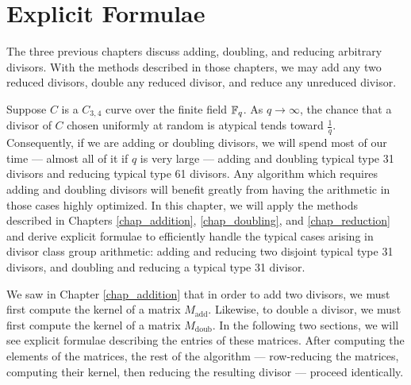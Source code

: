 
\section{Explicit Formulae}
\label{chap_typical_case}

The three previous chapters discuss adding, doubling, and reducing arbitrary divisors.
With the methods described in those chapters, we may add any two reduced divisors,
double any reduced divisor, and reduce any unreduced divisor.

Suppose $C$ is a $C_{3,4}$ curve over the finite field $\mathbb{F}_q$.
As $q \to \infty$, the chance that a divisor of $C$ chosen uniformly at random is atypical
tends toward $\frac 1 q$.
Consequently, if we are adding or doubling divisors,
we will spend most of our time ---
almost all of it if $q$ is very large ---
adding and doubling typical type 31 divisors and reducing typical type 61 divisors.
Any algorithm which requires adding and doubling divisors will benefit greatly from
having the arithmetic in those cases highly optimized.
In this chapter, we will apply the methods described in
Chapters \ref{chap_addition}, \ref{chap_doubling}, and \ref{chap_reduction}
and derive explicit formulae to efficiently handle
the typical cases arising in divisor class group arithmetic:
adding and reducing two disjoint typical type 31 divisors,
and doubling and reducing a typical type 31 divisor.

We saw in Chapter \ref{chap_addition} that in order to add two divisors,
we must first compute the kernel of a matrix $M_{\text{add}}$.
Likewise, to double a divisor, we must first compute the kernel of a matrix $M_{\text{doub}}$.
In the following two sections, we will see explicit formulae describing the entries of these matrices.
After computing the elements of the matrices,
the rest of the algorithm ---
row-reducing the matrices, computing their kernel, then reducing the resulting divisor ---
proceed identically.

